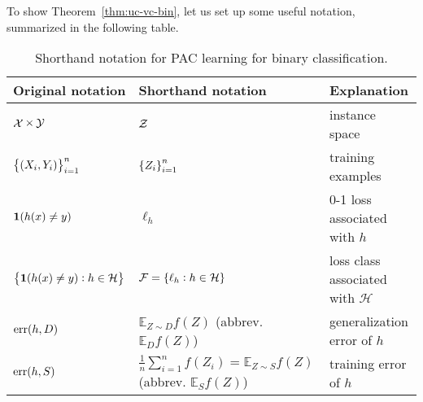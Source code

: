 \documentclass{article}
\DeclareMathOperator*{\err}{{\rm err}}
\DeclareMathOperator*{\Xcal}{{\cal X}}
\DeclareMathOperator*{\Ycal}{{\cal Y}}
\DeclareMathOperator*{\Zcal}{{\cal Z}}
\newcommand{\EE}{\mathbb{E}}
\newcommand{\Hcal}{\mathcal{H}}
\newcommand{\Fcal}{\mathcal{F}}
\newcommand*{\one}{{\bf 1}}
\begin{document}
To show Theorem~\ref{thm:uc-vc-bin}, let us set up some useful notation, summarized
in the following table.

\begin{table}[H]
\begin{tabular}{|l|l|l|}
\hline
Original notation & Shorthand notation & Explanation\\
\hline
$\Xcal \times \Ycal$ & $\Zcal$ & instance space\\
$\cbr{(X_i, Y_i)}_{i=1}^n$ & $\cbr{Z_i}_{i=1}^n$ & training examples \\
$\one(h(x) \neq y)$ & $\ell_h$ & 0-1 loss associated with $h$\\
$\cbr{\one(h(x) \neq y): h \in \Hcal}$ & $\Fcal = \cbr{\ell_h: h \in \Hcal}$ & loss class associated with $\Hcal$\\
$\err(h,D)$ & $\EE_{Z \sim D} f(Z)$ (abbrev. $\EE_D f(Z)$) & generalization error of $h$\\
$\err(h,S)$ & $\frac{1}{n} \sum_{i=1}^n f(Z_i) = \EE_{Z \sim S} f(Z)$ (abbrev. $\EE_S f(Z)$) & training error of $h$ \\
\hline
\end{tabular}
\caption{Shorthand notation for PAC learning for binary classification.}
\label{table:notation}
\end{table}
\end{document}
